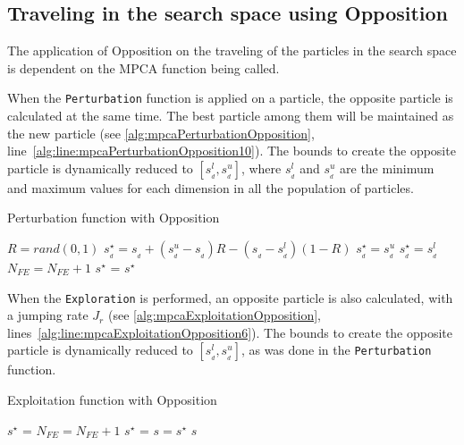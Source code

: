 \subsection{Traveling in the search space using Opposition}

The application of Opposition on the traveling of the particles in the search space is dependent on the MPCA function being called.

When the \texttt{Perturbation} function is applied on a particle, the opposite particle is calculated at the same time. The best particle among them will be maintained as the new particle (see \autoref{alg:mpcaPerturbationOpposition}, line~\ref{alg:line:mpcaPerturbationOpposition10}). The bounds to create the opposite particle is dynamically reduced to $\left[ s^l_{_d}, s^u_{_d} \right]$, where $s^l_{_d}$ and $s^u_{_d}$ are the minimum and maximum values for each dimension in all the population of particles.

\begin{algorithm}[H]
\caption{Perturbation function with Opposition}
\label{alg:mpcaPerturbationOpposition}
\footnotesize
\begin{algorithmic}[1]
\State $R = rand(0,1)$
\State $s_{_d}^\star = s_{_d} + \left(s^u_{_d} - s_{_d}\right) R - \left(s_{_d} - s^l_{_d}\right) \left(1 - R\right)$
\State $s_{_d}^\star = s^u_{_d}$
\State $s_{_d}^\star = s^l_{_d}$
\EndIf
\EndFor
\State $N_{FE} = N_{FE} + 1$
\State $s^\star$ =  \label{alg:line:mpcaPerturbationOpposition10}
\State \Return $s^\star$
\EndFunction
\end{algorithmic}
\end{algorithm}

When the \texttt{Exploration} is performed, an opposite particle is also calculated, with a jumping rate $J_r$ (see \autoref{alg:mpcaExploitationOpposition}, lines~\ref{alg:line:mpcaExploitationOpposition6}). The bounds to create the opposite particle is dynamically reduced to $\left[ s^l_{_d}, s^u_{_d} \right]$, as was done in the \texttt{Perturbation} function.

\begin{algorithm}[H]
\caption{Exploitation function with Opposition}
\label{alg:mpcaExploitationOpposition}
\footnotesize
\begin{algorithmic}[1]
\State $s^\star$ = 
\State $N_{FE} = N_{FE} + 1$
\State $s^\star$ =  \label{alg:line:mpcaExploitationOpposition6}
\EndIf
{}
\State $s = s^\star$
\EndIf
\EndFor
\State \Return $s$
\EndFunction
\end{algorithmic}
\end{algorithm}

